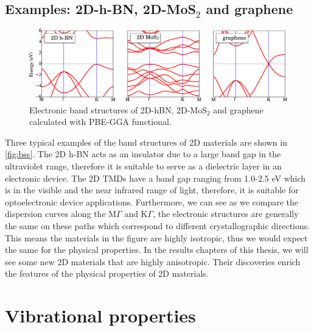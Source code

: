 \subsection{Examples: 2D-h-BN, 2D-MoS$_2$ and graphene}
\begin{figure}[htbp!] 
\centering  
\includegraphics[width=\textwidth]{bss.eps}
\caption{Electronic band structures of 2D-hBN, 2D-MoS$_2$ and graphene calculated with PBE-GGA functional. }  
\label{fig:bss}
\end{figure} 
Three typical examples of the band structures of 2D materials are shown in \autoref{fig:bss}. The 2D h-BN acts as an insulator due to a large band gap in the ultraviolet range, therefore it is suitable to serve as a dielectric layer in an electronic device. The 2D TMDs have a band gap ranging from 1.0-2.5 eV which is in the visible and the near infrared range of light, therefore, it is suitable for optoelectronic device applications. Furthermore, we can see as we compare the dispersion curves along the M$\Gamma$ and K$\Gamma$, the electronic structures are generally the same on these paths which correspond to different crystallographic directions. This means the materials in the figure are highly isotropic, thus we would expect the same for the physical properties. In the results chapters of this thesis, we will see some new 2D materials that are highly anisotropic. Their discoveries enrich the features of the physical properties of 2D materials.

\section{Vibrational properties}

